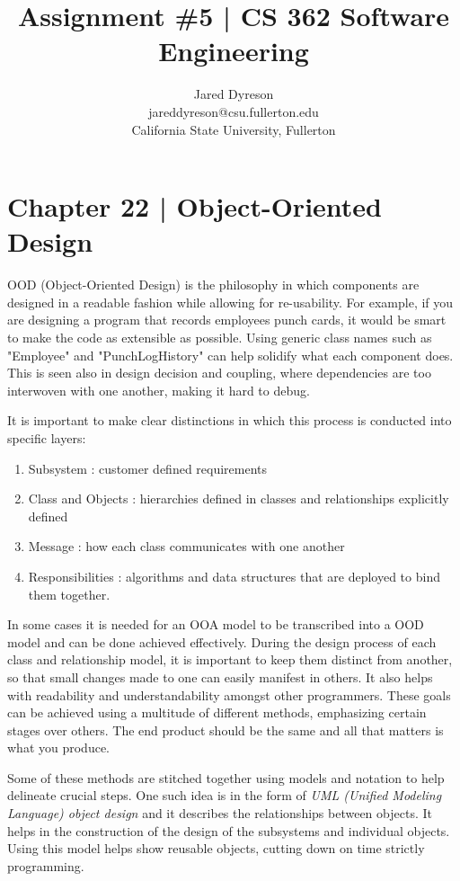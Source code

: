 \documentclass{article}
\title{Assignment \#5 | CS 362 Software Engineering}
\author{Jared Dyreson \\
        jareddyreson@csu.fullerton.edu \\
        California State University, Fullerton}
\date
\begin{document}
\maketitle
\tableofcontents

\newpage

\section{Chapter 22 | Object-Oriented Design}

OOD (Object-Oriented Design) is the philosophy in which components are designed in a readable fashion while allowing for re-usability.
For example, if you are designing a program that records employees punch cards, it would be smart to make the code as extensible as possible.
Using generic class names such as "Employee" and "PunchLogHistory" can help solidify what each component does.
This is seen also in design decision and coupling, where dependencies are too interwoven with one another, making it hard to debug.

It is important to make clear distinctions in which this process is conducted into specific layers:

\begin{enumerate}
\item Subsystem : customer defined requirements
\item Class and Objects : hierarchies defined in classes and relationships explicitly defined
\item Message : how each class communicates with one another
\item Responsibilities : algorithms and data structures that are deployed to bind them together.
\end{enumerate}

In some cases it is needed for an OOA model to be transcribed into a OOD model and can be done achieved effectively.
During the design process of each class and relationship model, it is important to keep them distinct from another, so that small changes made to one can easily manifest in others.
It also helps with readability and understandability amongst other programmers.
These goals can be achieved using a multitude of different methods, emphasizing certain stages over others.
The end product should be the same and all that matters is what you produce.

Some of these methods are stitched together using models and notation to help delineate crucial steps.
One such idea is in the form of \emph{UML (Unified Modeling Language) object design} and it describes the relationships between objects.
It helps in the construction of the design of the subsystems and individual objects.
Using this model helps show reusable objects, cutting down on time strictly programming.
\end{document}

